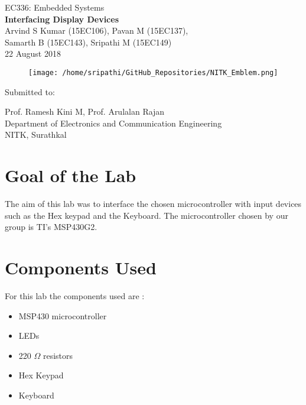 \documentclass[12pt, letterpaper]{article}
\begin{document}
\begin{titlepage}

\begin{center}
	\large{EC336: Embedded Systems}\\
	\huge{\textbf{Interfacing Display Devices}}\\
	\large{Arvind S Kumar (15EC106), Pavan M (15EC137),\\ Samarth B (15EC143), Sripathi M (15EC149)}\\
	\large{22 August 2018}
\end{center}	

\begin{figure}[!h]
	\centering
	\texttt{[image: /home/sripathi/GitHub\_Repositories/NITK\_Emblem.png]}
	\label{fig:NITKEmblem}
\end{figure}	
\begin{center}
	
\huge{Submitted to:}\\
\begin{large}
Prof. Ramesh Kini M, Prof. Arulalan Rajan\\
Department of Electronics and Communication Engineering\\
NITK, Surathkal
\end{large}

\end{center}

\end{titlepage}

\section{Goal of the Lab}

The aim of this lab was to interface the chosen microcontroller with input devices such as the Hex keypad and the Keyboard. The microcontroller chosen by our group is TI's MSP430G2.

\section{Components Used}

For this lab the components used are :

\begin{itemize}
	\item MSP430 microcontroller
	\item LEDs
	\item 220 $\Omega$ resistors
	\item Hex Keypad
	\item Keyboard
\end{itemize}
\end{document}

